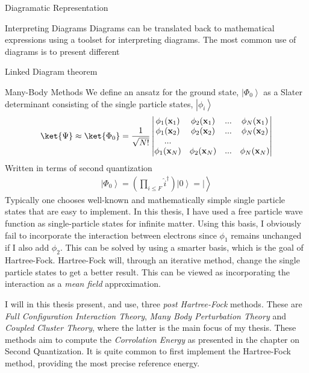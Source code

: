 \documentclass[twoside,english]{uiofysmaster}
\begin{document}
\begin{chapter}{Diagramatic Representation}
	\begin{section}{Interpreting Diagrams}
		Diagrams can be translated back to mathematical expressions using a toolset for interpreting diagrams. The most common use of diagrams is to present different 
	\end{section}

	\begin{section}{Linked Diagram theorem}
		
	\end{section}


\end{chapter}



\begin{chapter}{Many-Body Methods}
	We define an ansatz for the ground state, $\left| \Phi_0 \right>$ as a Slater determinant consisting of the single particle states, $\left| \phi_i \right>$
	\begin{align}
		\ket{\Psi} \approx \ket{\Phi_0} = 	\frac{1}{ \sqrt{N!} } \left|\begin{matrix}
			\phi_1(\mathbf{x}_1) & \phi_2(\mathbf{x}_1) & ... & \phi_N(\mathbf{x}_1) \\
			\phi_1(\mathbf{x}_2) & \phi_2(\mathbf{x}_2) & ... & \phi_N(\mathbf{x}_2) \\
			... & & & \\
			\phi_1(\mathbf{x}_N) & \phi_2(\mathbf{x}_N) & ... & \phi_N(\mathbf{x}_N) 
		\end{matrix} \right|
	\end{align}
	Written in terms of second quantization
	\begin{align}
		\left| \Phi_0 \right> = \left( \prod_{i \leq F} \hat i^\dagger \right) \left| 0 \right> = |\left.  \right> 
	\end{align}
	Typically one chooses well-known and mathematically simple single particle states that are easy to implement. In this thesis, I have used a free particle wave function as single-particle states for infinite matter. Using this basis, I obviously fail to incorporate the interaction between electrons since $\phi_1$ remains unchanged if I also add $\phi_2$. This can be solved by using a smarter basis, which is the goal of Hartree-Fock. Hartree-Fock will, through an iterative method, change the single particle states to get a better result. This can be viewed as incorporating the interaction as a \textit{mean field} approximation. 

	I will in this thesis present, and use, three \textit{post Hartree-Fock} methods. These are \textit{Full Configuration Interaction Theory}, \textit{Many Body Perturbation Theory} and \textit{Coupled Cluster Theory}, where the latter is the main focus of my thesis. These methods aim to compute the \textit{Corrolation Energy} as presented in the chapter on Second Quantization. It is quite common to first implement the Hartree-Fock method, providing the most precise reference energy. 


\end{chapter}
\end{document}
